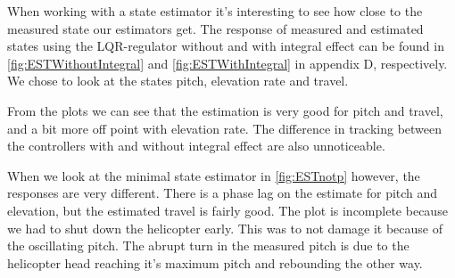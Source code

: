 When working with a state estimator it's interesting to see how close to the measured state our estimators get. The response of measured and estimated states using the LQR-regulator without and with integral effect can be found in \cref{fig:ESTWithoutIntegral} and \cref{fig:ESTWithIntegral} in appendix D, respectively. We chose to look at the states pitch, elevation rate and travel.

From the plots we can see that the estimation is very good for pitch and travel, and a bit more off point with elevation rate. The difference in tracking between the controllers with and without integral effect are also unnoticeable.

When we look at the minimal state estimator in \cref{fig:ESTnotp} however, the responses are very different. There is a phase lag on the estimate for pitch and elevation, but the estimated travel is fairly good. The plot is incomplete because we had to shut down the helicopter early. This was to not damage it because of the oscillating pitch. The abrupt turn in the measured pitch is due to the helicopter head reaching it's maximum pitch and rebounding the other way.

